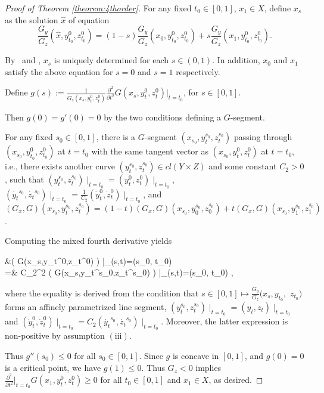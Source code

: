 \begin{proof}[Proof of Theorem \ref{theorem:4thorder}]
	For any fixed $t_0 \in [0,1]$, $x_1 \in X$, define $x_s$ as the solution $\hat{x}$ of equation
	\begin{equation*}
	\frac{G_y}{G_z}(\hat{x}, y_{t_0}^{0},z_{t_0}^{0}) = (1-s) \frac{G_y}{G_z}(x_0, y_{t_0}^{0},z_{t_0}^{0}) +s \frac{G_y}{G_z}(x_1, y_{t_0}^{0},z_{t_0}^{0}).
	\end{equation*}
	
	By \Gseven\ and \Geight, $x_s$ is uniquely determined for each $s\in (0,1)$. In addition, $x_0$ and $x_1$ satisfy the above equation for $s =0$ and $s=1$ respectively. 
	
	Define $g(s):=\frac{1}{G_z(x_s,y_t^{0},z_t^{0})}\frac{\partial^2}{\partial t^2}G(x_s, y_t^{0}, z_t^{0})\Big|_{t=t_0}$, for $s\in [0,1]$.
	
	Then $g(0) =g'(0)  =0 $ by the two conditions defining a $G$-segment. 
	
	
	For any fixed $s_0 \in [0,1]$, there is a $G$-segment $(x_{s_0}, y_t^{s_0}, z_t^{s_0})$ passing through $(x_{s_0}, y_{t_0}^{0}, z_{t_0}^{0})$ at $t=t_0$ with the same tangent vector as $(x_{s_0}, y_t^{0}, z_t^{0})$ at $t=t_0$, i.e., there exists 
	another curve $(y_t^{s_0}, z_t^{s_0}) \in cl( Y \times Z)$ and some constant $C_2>0$, such that $(y_t^{s_0},z_t^{s_0})\mid _{t=t_0} = (y_t^{0},z_t^{0})\mid _{t=t_0}$,  $(\dot{y_t}^{s_0},\dot{z_t}^{s_0})\mid _{t=t_0} = \frac{1}{C_2} (\dot{y}_t^{0},\dot{z}_t^{0})\mid _{t=t_0}  $, and $(G_x, G)(x_{s_0},y_t^{s_0},z_t^{s_0}) = (1-t)(G_x, G)(x_{s_0},y_0^{s_0},z_0^{s_0})+t (G_x, G)(x_{s_0},y_1^{s_0},z_1^{s_0})$. 
	
	Computing the mixed fourth derivative yields
	\begin{flalign*}
	&\Biggl( G(x_s,y_t^{0},z_t^{0}) \Biggr) \Bigg|_{(s,t)=(s_0, t_0)} \\
	=& C_2^2	\Biggl( G(x_s,y_t^{s_0},z_t^{s_0}) \Biggr) \Bigg|_{(s,t)=(s_0, t_0)} ,
	\end{flalign*}
	where the equality is derived from the condition that $s \in [0,1] \longmapsto \frac{G_y}{G_z}(x_s, y_{t_0},$ $ z_{t_0})$ forms an affinely parametrized line segment,  $(y_t^{s_0},z_t^{s_0})\mid _{t=t_0} = (y_t,z_t)\mid _{t=t_0}$ and $ (\dot{y}_t^{0},\dot{z}_t^{0})\mid _{t=t_0} = C_2(\dot{y_t}^{s_0},\dot{z_t}^{s_0})\mid _{t=t_0} $. Moreover, the latter expression is non-positive by assumption $\mathrm{(iii)}$.
	
	Thus $g''(s_0)\le 0$ for all $s_0 \in [0,1]$. Since $g$ is concave in $[0,1]$, and $g(0)=0$ is a critical point, we have $g(1)\le 0$. Thus $G_z<0$ implies $\frac{\partial^2}{\partial t^2}\Big|_{t=t_0}G(x_1, y_t^{0}, z_t^{0}) \ge 0$ for all $t_0 \in [0,1]$ and $x_1 \in X$, as desired. 
\end{proof}


